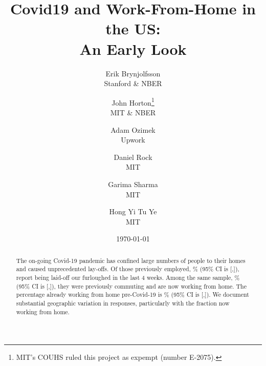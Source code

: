 \documentclass[12pt]{article}
\newcommand{\covid}{Covid-19}
\begin{document}
 

\title{Covid19 and Work-From-Home in the US:\\ An Early Look}

\date{\today}

\author{Erik Brynjolfsson\\Stanford \& NBER \and John Horton\footnote{
    MIT's COUHS ruled this project as expempt (number E-2075). 
  }\\MIT \& NBER \and Adam Ozimek\\Upwork \and Daniel Rock\\MIT \and Garima Sharma\\MIT \and Hong Yi Tu Ye\\MIT}

\maketitle

\begin{abstract}
  \noindent The on-going \covid{} pandemic has confined large numbers of people to their homes and caused unprecedented lay-offs.
  Of those previously employed, \LaidOff{}\% (95\% CI is [\LaidOffLB,\LaidOffUB]), report being laid-off our furloughed in the last 4 weeks.
  Among the same sample, \WFH{}\% (95\% CI is [\WFHLB,\WFHUB]), they were previously commuting and are now working from home.
  The percentage already working from home pre-Covid-19 is \alreadyWFH{}\% (95\% CI is [\alreadyWFHLB,\alreadyWFHUB]). 
  We document substantial geographic variation in responses, particularly with the fraction now working from home. 
  \newline 
\end{abstract} 

\onehalfspacing 
\end{document}

